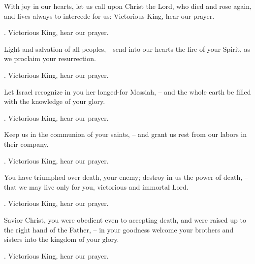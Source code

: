 \lettrine[loversize=0.15,lines=2]{W}{}ith joy in our hearts, let us call upon Christ the Lord, who died and rose again, and lives always to intercede for us: Victorious King, hear our prayer.
\par \Rbar. Victorious King, hear our prayer.

Light and salvation of all peoples, - send into our hearts the fire of your Spirit, as we proclaim your resurrection.
\par \Rbar. Victorious King, hear our prayer.

Let Israel recognize in you her longed-for Messiah,
– and the whole earth be filled with the knowledge of your glory.
\par \Rbar. Victorious King, hear our prayer.

Keep us in the communion of your saints,
– and grant us rest from our labors in their company.
\par \Rbar. Victorious King, hear our prayer.

You have triumphed over death, your enemy; destroy in us the power of death,
– that we may live only for you, victorious and immortal Lord.
\par \Rbar. Victorious King, hear our prayer.

Savior Christ, you were obedient even to accepting death, and were raised up to the right hand of the Father,
– in your goodness welcome your brothers and sisters into the kingdom of your glory.
\par \Rbar. Victorious King, hear our prayer.
